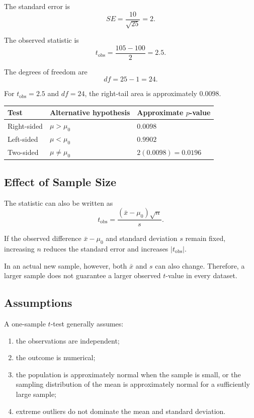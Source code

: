 \documentclass[11pt]{article}
\begin{document}
The standard error is
\[
SE=\frac{10}{\sqrt{25}}=2.
\]

The observed statistic is
\[
t_{\mathrm{obs}}=\frac{105-100}{2}=2.5.
\]

The degrees of freedom are
\[
df=25-1=24.
\]

For \(t_{\mathrm{obs}}=2.5\) and \(df=24\), the right-tail area is approximately \(0.0098\).

\begin{center}
\begin{tabular}{lll}
\toprule
Test & Alternative hypothesis & Approximate \(p\)-value \\
\midrule
Right-sided & \(\mu>\mu_0\) & \(0.0098\) \\
Left-sided & \(\mu<\mu_0\) & \(0.9902\) \\
Two-sided & \(\mu\neq\mu_0\) & \(2(0.0098)=0.0196\) \\
\bottomrule
\end{tabular}
\end{center}

\subsection{Effect of Sample Size}
The statistic can also be written as
\[
t_{\mathrm{obs}}
=\frac{(\bar{x}-\mu_0)\sqrt{n}}{s}.
\]

If the observed difference \(\bar{x}-\mu_0\) and standard deviation \(s\) remain fixed, increasing \(n\) reduces the standard error and increases \(|t_{\mathrm{obs}}|\).

In an actual new sample, however, both \(\bar{x}\) and \(s\) can also change. Therefore, a larger sample does not guarantee a larger observed \(t\)-value in every dataset.

\subsection{Assumptions}
A one-sample \(t\)-test generally assumes:
\begin{enumerate}[noitemsep]
    \item the observations are independent;
    \item the outcome is numerical;
    \item the population is approximately normal when the sample is small, or the sampling distribution of the mean is approximately normal for a sufficiently large sample;
    \item extreme outliers do not dominate the mean and standard deviation.
\end{enumerate}
\end{document}
